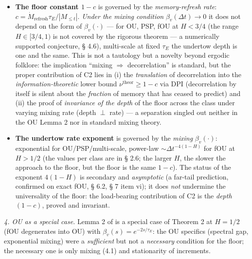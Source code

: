 \documentclass[12pt]{iopart}
\providecommand{\tightlist}{\setlength{\itemsep}{0pt}\setlength{\parskip}{0pt}}
\begin{document}
\begin{itemize}

\tightlist

\item

  \textbf{The floor constant \(1-c\)} is governed by the \emph{memory-refresh rate}: \(c = \dot M_{\text{refresh}}\tau_E/|M_{\le t}|\). \emph{Under the mixing condition} \(\beta_v(\Delta t)\to 0\) it does not depend on the form of \(\beta_v(\cdot)\) --- for OU, PSP, fOU at \(H < 3/4\) (the range \(H \in [3/4,1)\) is not covered by the rigorous theorem --- a numerically supported conjecture, § 4.6), multi-scale at fixed \(\tau_E\) the undertow depth is one and the same. This is not a tautology but a novelty beyond ergodic folklore: the implication ``mixing \(\Rightarrow\) decorrelation'' is standard, but the proper contribution of C2 lies in (i) the \emph{translation} of decorrelation into the \emph{information-theoretic} lower bound \(\nu^{\text{theor}} \ge 1-c\) via DPI (decorrelation by itself is silent about the \emph{fraction} of memory that has ceased to predict) and (ii) the proof of \emph{invariance of the depth} of the floor across the class under varying mixing rate (depth \(\perp\) rate) --- a separation singled out neither in the OU Lemma 2 nor in standard mixing theory.

\item

  \textbf{The undertow rate exponent} is governed by the \emph{mixing} \(\beta_v(\cdot)\): exponential for OU/PSP/multi-scale, power-law \(\sim\Delta t^{-4(1-H)}\) for fOU at \(H > 1/2\) (the values per class are in § 2.6; the larger \(H\), the slower the approach to the floor, but the floor is the same \(1-c\)). The status of the exponent \(4(1-H)\) is secondary and \emph{asymptotic} (a far-tail prediction, confirmed on exact fOU, § 6.2, § 7 item vi); it does \emph{not} undermine the universality of the floor: the load-bearing contribution of C2 is the \emph{depth} \((1-c)\), proved and invariant.

\end{itemize}



\emph{4. OU as a special case.} Lemma 2 of \cite{Andriishin2026b} is a special case of Theorem 2 at \(H = 1/2\) (fOU degenerates into OU) with \(\beta_v(s) = e^{-2s/\tau_E}\): the OU specifics (spectral gap, exponential mixing) were a \emph{sufficient} but not a \emph{necessary} condition for the floor; the necessary one is only mixing (4.1) and stationarity of increments.
\end{document}
